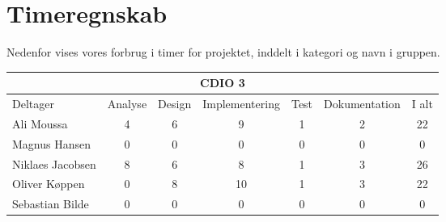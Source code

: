 \chapter{Timeregnskab}

Nedenfor vises vores forbrug i timer for projektet, inddelt i kategori og navn i gruppen.

\begin{table}[h]
    \centering
        \begin{tabular}{|l|c|c|c|c|c|c|}
                \hline
            \multicolumn{7}{|c|}{CDIO 3}
            \\ \hline
                    Deltager         &  Analyse  &  Design  &  Implementering  &  Test  &  Dokumentation  &  I alt
            \\ \hline
                    Ali Moussa       &    4      &    6     &        9         &    1   &        2        &    22
            \\ \hline
                    Magnus Hansen    &    0      &    0     &        0         &    0   &        0        &    0
            \\ \hline
                    Niklaes Jacobsen &    8      &    6     &        8         &    1   &        3        &    26
            \\ \hline
                    Oliver Køppen    &    0      &    8     &        10        &    1   &        3        &    22
            \\ \hline
                    Sebastian Bilde  &    0      &    0     &        0         &    0   &        0        &    0
            \\ \hline
        \end{tabular}
\end{table}